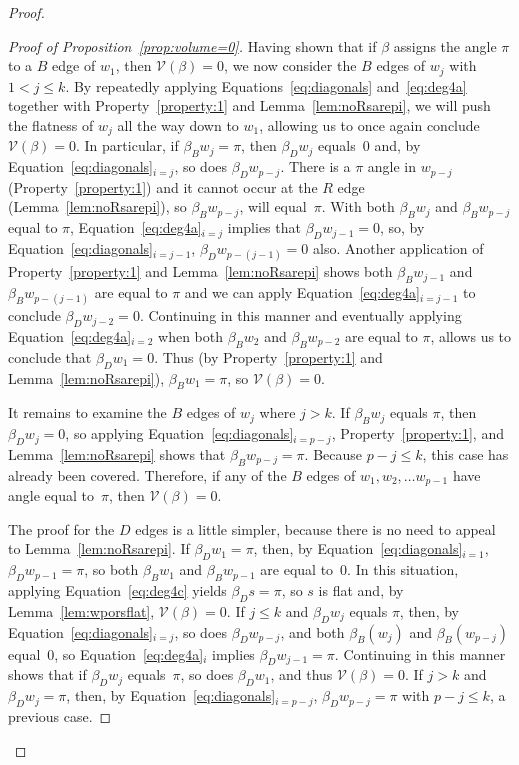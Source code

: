 \documentclass[reqno]{amsart}
\theoremstyle{plain}
\theoremstyle{definition}
\begin{document}
\begin{proof}
\begin{proof}[Proof of Proposition~\ref{prop:volume=0}]
Having shown that if $\beta$ assigns the angle $\pi$ to a $B$ edge of $w_1$, then $\mathcal{V}(\beta)=0$, we now consider the $B$ edges of $w_j$ with $1<j\le k$.  By repeatedly applying Equations~\eqref{eq:diagonals} and~\eqref{eq:deg4a} together with Property~\ref{property:1} and Lemma~\ref{lem:noRsarepi}, we will push the flatness of $w_j$ all the way down to $w_1$, allowing us to once again conclude $\mathcal{V}(\beta)=0$.  In particular, if $\beta_B w_j=\pi$, then $\beta_D w_j$ equals~$0$ and, by Equation~\eqref{eq:diagonals}$_{i=j}$, so does $\beta_D w_{p-j}$.  There is a $\pi$ angle in $w_{p-j}$ (Property~\ref{property:1}) and it cannot occur at the $R$ edge (Lemma~\ref{lem:noRsarepi}), so $\beta_B w_{p-j}$, will equal~$\pi$.  With both $\beta_B w_j$ and $\beta_B w_{p-j}$ equal to $\pi$, Equation~\eqref{eq:deg4a}$_{i=j}$ implies that $\beta_D w_{j-1}=0$, so, by  Equation~\eqref{eq:diagonals}$_{i=j-1}$, $\beta_D w_{p-(j-1)}=0$ also.  Another application of Property~\ref{property:1} and Lemma~\ref{lem:noRsarepi} shows both $\beta_B w_{j-1}$ and $\beta_B w_{p-(j-1)}$ are equal to $\pi$ and we can apply Equation~\eqref{eq:deg4a}$_{i=j-1}$ to conclude $\beta_D w_{j-2}=0$.  Continuing in this manner and eventually applying Equation~\eqref{eq:deg4a}$_{i=2}$ when both $\beta_B w_2$ and $\beta_B w_{p-2}$ are equal to $\pi$, allows us to conclude that $\beta_D w_1=0$.  Thus (by Property~\ref{property:1} and Lemma~\ref{lem:noRsarepi}), $\beta_B w_1=\pi$, so $\mathcal{V}(\beta)=0$.

It remains to examine the $B$ edges of $w_j$ where $j>k$.  If $\beta_B w_j$ equals $\pi$, then $\beta_D w_j=0$, so applying Equation~\eqref{eq:diagonals}$_{i=p-j}$, Property~\ref{property:1}, and Lemma~\ref{lem:noRsarepi} shows that $\beta_B w_{p-j}=\pi$.  Because $p-j\le k$, this case has already been covered.  Therefore, if any of the $B$ edges of $w_1, w_2, \dots w_{p-1}$ have angle equal to~$\pi$, then $\mathcal{V}(\beta)=0$.

The proof for the $D$ edges is a little simpler, because there is no need to appeal to Lemma~\ref{lem:noRsarepi}. If $\beta_D w_1=\pi$, then, by Equation~\eqref{eq:diagonals}$_{i=1}$, $\beta_D w_{p-1}=\pi$, so both $\beta_B w_1$ and $\beta_B w_{p-1}$ are equal to~$0$. In this situation, applying Equation~\eqref{eq:deg4c} yields $\beta_D s=\pi$,
so $s$ is flat and, by Lemma~\ref{lem:wporsflat}, $\mathcal{V}(\beta)=0$.  If $j\le k$ and $\beta_D w_j$ equals $\pi$, then, by Equation~\eqref{eq:diagonals}$_{i=j}$, so does $\beta_D w_{p-j}$, and both $\beta_B(w_j)$ and $\beta_B(w_{p-j})$ equal~$0$, so Equation~\eqref{eq:deg4a}$_i$ implies $\beta_D w_{j-1}=\pi$.  Continuing in this manner shows that if $\beta_D w_j$ equals~$\pi$, so does $\beta_D w_1$, and thus $\mathcal{V}(\beta)=0$.  If $j> k$ and $\beta_D w_j=\pi$, then, by Equation~\eqref{eq:diagonals}$_{i=p-j}$, $\beta_D w_{p-j}=\pi$ with $p-j\le k$, a previous case.  
\end{proof}


\end{proof}
\end{document}

